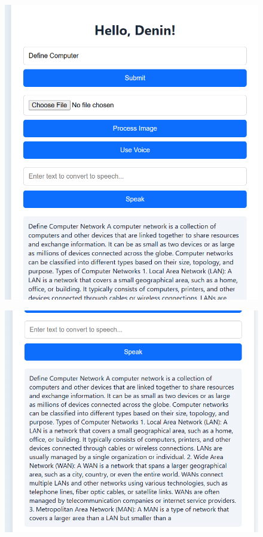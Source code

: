 \documentclass{josis}
\begin{document}
\begin{figure}[h]
  \centering
  \begin{minipage}{0.45\textwidth}
    \centering
    \includegraphics[width=\linewidth]{third.png}
    
    \label{fig:minipage1}
  \end{minipage}
  \hfill
  \begin{minipage}{0.45\textwidth}
    \centering
    \includegraphics[width=\linewidth]{fourth.png}
    
    \label{fig:minipage2}
  \end{minipage}
\end{figure}
\end{document}
